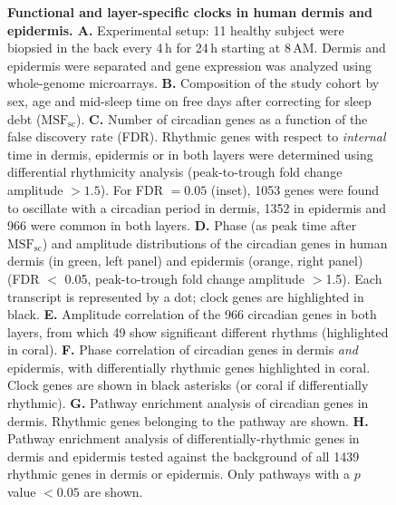 \begin{figure}
\begin{center}
		\caption{\textbf{Functional and layer-specific clocks in human dermis and epidermis. A.} Experimental setup: 11 healthy subject were biopsied in the back every 4\,h for 24\,h starting at 8\,AM. Dermis and epidermis were separated and gene expression was analyzed using whole-genome microarrays.\textbf{ B. }Composition of the study cohort by sex, age and mid-sleep time on free days after correcting for sleep debt ($\textrm{MSF}_\textrm{sc}$). \textbf{C.} Number of circadian genes as a function of the false discovery rate (FDR). Rhythmic genes with respect to \textit{internal} time in dermis, epidermis or in both layers were determined using differential rhythmicity analysis (peak-to-trough fold change amplitude $>1.5$). For FDR $=0.05$ (inset), 1053 genes were found to oscillate with a circadian period in dermis, 1352 in epidermis and 966 were common in both layers. \textbf{D. }Phase (as peak time after $\textrm{MSF}_\textrm{sc}$) and amplitude distributions of the circadian genes in human dermis (in green, left panel) and epidermis (orange, right panel) (FDR $<$ 0.05, peak-to-trough fold change amplitude $>$1.5). Each transcript is represented by a dot; clock genes are highlighted in black. \textbf{E. }Amplitude correlation of the 966 circadian genes in both layers, from which 49 show significant different rhythms (highlighted in coral). \textbf{F. }Phase correlation of circadian genes in dermis \textit{and} epidermis, with differentially rhythmic genes highlighted in coral. Clock genes are shown in black asterisks (or coral if differentially rhythmic). \textbf{G.} Pathway enrichment analysis of circadian genes in dermis. Rhythmic genes belonging to the pathway are shown. \textbf{H.} Pathway enrichment analysis of differentially-rhythmic genes in dermis and epidermis tested against the background of all 1439 rhythmic genes in dermis or epidermis. Only pathways with a $p$ value $<0.05$ are shown.} %
		\label{fig:fig1}
	\end{center}
\end{figure}


